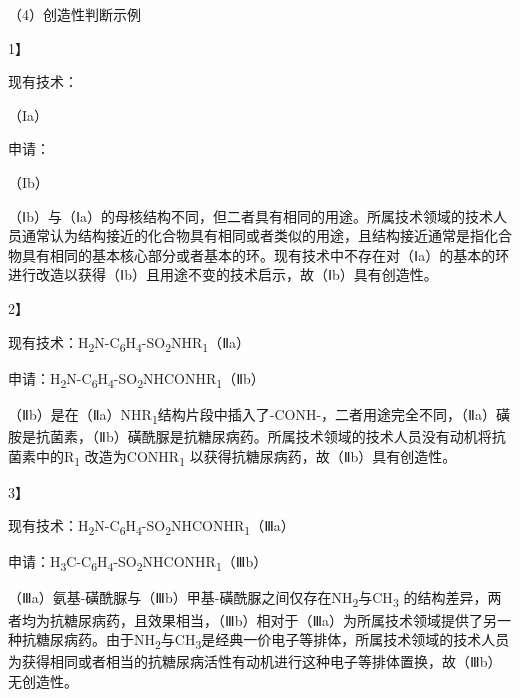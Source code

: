 {\setlength{\parindent}{17.1bp}（4）创造性判断示例\par}

{1】\par}

现有技术：

{\setlength{\parindent}{17.1bp}（Ia）\par}

申请：

{\setlength{\parindent}{17.1bp}（Ib）\par}

{\setlength{\parindent}{17.1bp}（Ⅰb）与（Ⅰa）的母核结构不同，但二者具有相同的用途。所属技术领域的技术人员通常认为结构接近的化合物具有相同或者类似的用途，且结构接近通常是指化合物具有相同的基本核心部分或者基本的环。现有技术中不存在对（Ⅰa）的基本的环进行改造以获得（Ⅰb）且用途不变的技术启示，故（Ⅰb）具有创造性。\par}

{2】\par}

现有技术：H\textsubscript{2}N-C\textsubscript{6}H\textsubscript{4}-SO\textsubscript{2}NHR\textsubscript{1}（Ⅱa）

申请：H\textsubscript{2}N-C\textsubscript{6}H\textsubscript{4}-SO\textsubscript{2}NHCONHR\textsubscript{1}（Ⅱb）

{\setlength{\parindent}{17.1bp}（Ⅱb）是在（Ⅱa）NHR\textsubscript{1}结构片段中插入了-CONH-，二者用途完全不同，（Ⅱa）磺胺是抗菌素，（Ⅱb）磺酰脲是抗糖尿病药。所属技术领域的技术人员没有动机将抗菌素中的R\textsubscript{1} 改造为CONHR\textsubscript{1} 以获得抗糖尿病药，故（Ⅱb）具有创造性。\par}

{3】\par}

现有技术：H\textsubscript{2}N-C\textsubscript{6}H\textsubscript{4}-SO\textsubscript{2}NHCONHR\textsubscript{1}（Ⅲa）

申请：H\textsubscript{3}C-C\textsubscript{6}H\textsubscript{4}-SO\textsubscript{2}NHCONHR\textsubscript{1}（Ⅲb）

{\setlength{\parindent}{17.1bp}（Ⅲa）氨基-磺酰脲与（Ⅲb）甲基-磺酰脲之间仅存在NH\textsubscript{2}与CH\textsubscript{3} 的结构差异，两者均为抗糖尿病药，且效果相当，（Ⅲb）相对于（Ⅲa）为所属技术领域提供了另一种抗糖尿病药。由于NH\textsubscript{2}与CH\textsubscript{3}是经典一价电子等排体，所属技术领域的技术人员为获得相同或者相当的抗糖尿病活性有动机进行这种电子等排体置换，故（Ⅲb）无创造性。\par}


